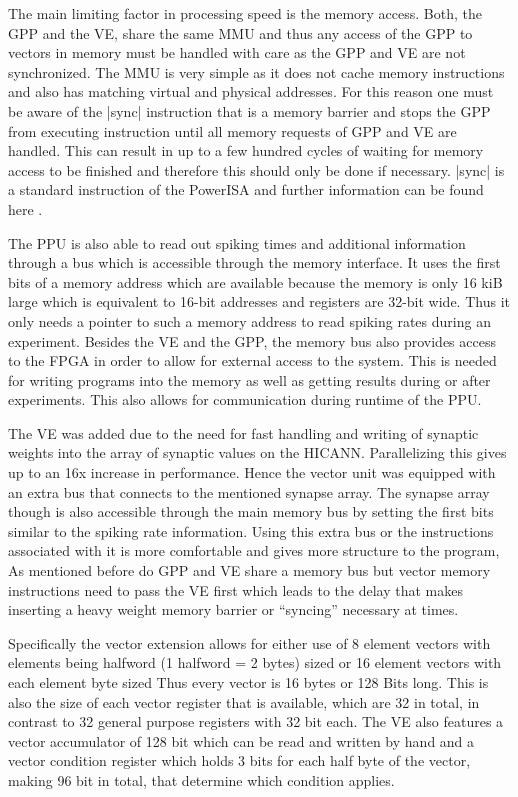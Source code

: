 The main limiting factor in processing speed is the memory access.
Both, the GPP and the VE, share the same MMU and thus any access of the GPP to vectors in memory must be handled with care as the GPP and VE are not synchronized.
The MMU is very simple as it does not cache memory instructions and also has matching virtual and physical addresses.
For this reason one must be aware of the |sync| instruction that is a memory barrier and stops the GPP from executing instruction until all memory requests of GPP and VE are handled.
This can result in up to a few hundred cycles of waiting for memory access to be finished and therefore this should only be done if necessary.
|sync| is a standard instruction of the PowerISA and further information can be found here .

The PPU is also able to read out spiking times and additional information through a bus which is accessible through the memory interface.
It uses the first bits of a memory address which are available because the memory is only 16 kiB large which is equivalent to 16-bit addresses and registers are 32-bit wide.
Thus it only needs a pointer to such a memory address to read spiking rates during an experiment.
Besides the VE and the GPP, the memory bus also provides access to the FPGA  in order to allow for external access to the system.
This is needed for writing programs into the memory as well as getting results during or after experiments.
This also allows for communication during runtime of the PPU.

The VE was added due to the need for fast handling and writing of synaptic weights into the array of synaptic values on the HICANN.
Parallelizing this gives up to an 16x increase in performance.
Hence the vector unit was equipped with an extra bus that connects to the mentioned synapse array.
The synapse array though is also accessible through the main memory bus by setting the first bits similar to the spiking rate information.
Using this extra bus or the instructions associated with it is more comfortable and gives more structure to the program,
As mentioned before do GPP and VE share a memory bus but vector memory instructions need to pass the VE first which leads to the delay that makes inserting a heavy weight memory barrier or ``syncing'' necessary at times.

Specifically the vector extension allows for either use of 8 element vectors with elements being halfword (1 halfword = 2 bytes) sized or 16 element vectors with each element byte sized
Thus every vector is 16 bytes or 128 Bits long.
This is also the size of each vector register that is available, which are 32 in total, in contrast to 32 general purpose registers with 32 bit each.
The VE also features a vector accumulator of 128 bit which can be read and written by hand and a vector condition register which holds 3 bits for each half byte of the vector, making 96 bit in total, that determine which condition applies.

